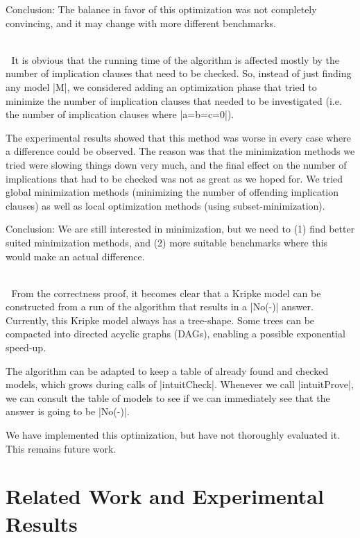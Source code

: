 \documentclass{llncs}
\begin{document}
Conclusion: The balance in favor of this optimization was not completely convincing, and it may change with more different benchmarks.

~\\ $\;$ It is obvious that the running time of the algorithm is affected mostly by the number of implication clauses that need to be checked. So, instead of just finding any model |M|, we considered adding an optimization phase that tried to minimize the number of implication clauses that needed to be investigated (i.e. the number of implication clauses where |a=b=c=0|).

The experimental results showed that this method was worse in every case where a difference could be observed. The reason was that the minimization methods we tried were slowing things down very much, and the final effect on the number of implications that had to be checked was not as great as we hoped for. We tried global minimization methods (minimizing the number of offending implication clauses) as well as local optimization methods (using subset-minimization).

Conclusion: We are still interested in minimization, but we need to (1) find better suited minimization methods, and (2) more suitable benchmarks where this would make an actual difference.

~\\ $\;$ From the correctness proof, it becomes clear that a Kripke model can be constructed from a run of the algorithm that results in a |No(-)| answer. Currently, this Kripke model always has a tree-shape. Some trees can be compacted into directed acyclic graphs (DAGs), enabling a possible exponential speed-up.

The algorithm can be adapted to keep a table of already found and checked models, which grows during calls of |intuitCheck|. Whenever we call |intuitProve|, we can consult the table of models to see if we can immediately see that the answer is going to be |No(-)|.

We have implemented this optimization, but have not thoroughly evaluated it. This remains future work.


\section{Related Work and Experimental Results}
\end{document}
